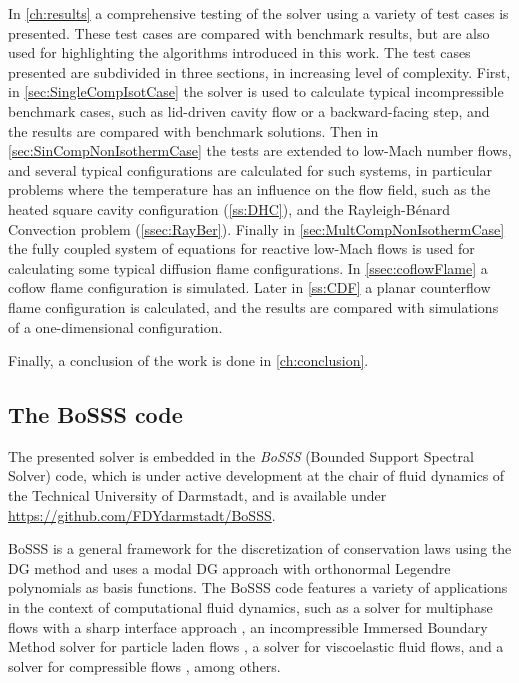 In \cref{ch:results} a comprehensive testing of the solver using a variety of test cases is presented. These test cases are compared with benchmark results, but are also used for highlighting the algorithms introduced in this work. The test cases presented are subdivided in three sections, in increasing level of complexity. First, in \cref{sec:SingleCompIsotCase} the solver is used to calculate typical incompressible benchmark cases, such as lid-driven cavity flow or a backward-facing step, and the results are compared with benchmark solutions. Then in \cref{sec:SinCompNonIsothermCase} the tests are extended to low-Mach number flows, and several typical configurations are calculated for such systems, in particular problems where the temperature has an influence on the flow field, such as the heated square cavity configuration (\cref{ss:DHC}), and the Rayleigh-Bénard Convection problem (\cref{ssec:RayBer}).
Finally in \cref{sec:MultCompNonIsothermCase} the fully coupled system of equations for reactive low-Mach flows is used for calculating some typical diffusion flame configurations. In \cref{ssec:coflowFlame} a coflow flame configuration is simulated. Later in \cref{ss:CDF} a planar counterflow flame configuration is calculated, and the results are compared with simulations of a one-dimensional configuration. 

Finally, a conclusion of the work is done in \cref{ch:conclusion}.

\subsection{The BoSSS code}
The presented solver is embedded in the \textit{BoSSS} (Bounded Support Spectral Solver) code, which is under active development at the chair of fluid dynamics of the Technical University of Darmstadt, and is available under \href{https://github.com/FDYdarmstadt/BoSSS}{https://github.com/FDYdarmstadt/BoSSS}.

BoSSS is a general framework for the discretization of conservation laws using the DG method and uses a modal DG approach with orthonormal Legendre polynomials as basis functions. The BoSSS code features a variety of applications in the context of computational fluid dynamics, such as a solver for multiphase flows with a sharp interface approach \parencite{kummerExtendedDiscontinuousGalerkin2017}, an incompressible Immersed Boundary Method solver for particle laden flows \parencite{krauseIncompressibleImmersedBoundary2017}, a solver for viscoelastic fluid flows\parencite{kikkerFullyCoupledHighorder}, and a solver for compressible flows \parencite{geisenhoferDiscontinuousGalerkinImmersed2019}, among others.


